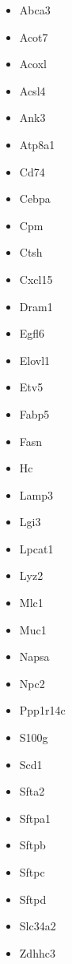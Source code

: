\documentclass[aps,superscriptaddress, notitlepage,longbibliography]{revtex4-1}
\begin{document}
\begin{itemize}
    \item Abca3
    \item Acot7
    \item Acoxl
    \item Acsl4
    \item Ank3
    \item Atp8a1
    \item Cd74
    \item Cebpa
    \item Cpm
    \item Ctsh
    \item Cxcl15
    \item Dram1
    \item Egfl6
    \item Elovl1
    \item Etv5
    \item Fabp5
    \item Fasn
    \item Hc
    \item Lamp3
    \item Lgi3
    \item Lpcat1
    \item Lyz2
    \item Mlc1
    \item Muc1
    \item Napsa
    \item Npc2
    \item Ppp1r14c
    \item S100g
    \item Scd1
    \item Sfta2
    \item Sftpa1
    \item Sftpb
    \item Sftpc
    \item Sftpd
    \item Slc34a2
    \item Zdhhc3
\end{itemize}


\end{document}
